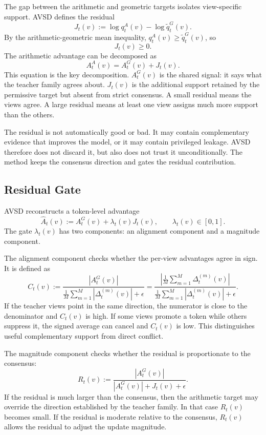 The gap between the arithmetic and geometric targets isolates view-specific support. AVSD defines the residual
\[
    J_t(v) := \log q_t^A(v)-\log \widetilde{q}_t^G(v).
\]
By the arithmetic-geometric mean inequality, $q_t^A(v)\geq \widetilde{q}_t^G(v)$, so
\[
    J_t(v)\geq 0.
\]
The arithmetic advantage can be decomposed as
\[
    A_t^A(v)=A_t^G(v)+J_t(v).
\]
This equation is the key decomposition. $A_t^G(v)$ is the shared signal: it says what the teacher family agrees about. $J_t(v)$ is the additional support retained by the permissive target but absent from strict consensus. A small residual means the views agree. A large residual means at least one view assigns much more support than the others.

The residual is not automatically good or bad. It may contain complementary evidence that improves the model, or it may contain privileged leakage. AVSD therefore does not discard it, but also does not trust it unconditionally. The method keeps the consensus direction and gates the residual contribution.

\subsection{Residual Gate}

AVSD reconstructs a token-level advantage
\[
    \widehat{A}_t(v)
    := A_t^G(v)+\lambda_t(v)J_t(v),
    \qquad \lambda_t(v)\in[0,1].
\]
The gate $\lambda_t(v)$ has two components: an alignment component and a magnitude component.

The alignment component checks whether the per-view advantages agree in sign. It is defined as
\[
    C_t(v)
    :=
    \frac{|A_t^G(v)|}
    {\frac{1}{M}\sum_{m=1}^{M}|\Delta_t^{(m)}(v)|+\epsilon}
    =
    \frac{
    \left|\frac{1}{M}\sum_{m=1}^{M}\Delta_t^{(m)}(v)\right|}
    {\frac{1}{M}\sum_{m=1}^{M}|\Delta_t^{(m)}(v)|+\epsilon}.
\]
If the teacher views point in the same direction, the numerator is close to the denominator and $C_t(v)$ is high. If some views promote a token while others suppress it, the signed average can cancel and $C_t(v)$ is low. This distinguishes useful complementary support from direct conflict.

The magnitude component checks whether the residual is proportionate to the consensus:
\[
    R_t(v)
    :=
    \frac{|A_t^G(v)|}{|A_t^G(v)|+J_t(v)+\epsilon}.
\]
If the residual is much larger than the consensus, then the arithmetic target may override the direction established by the teacher family. In that case $R_t(v)$ becomes small. If the residual is moderate relative to the consensus, $R_t(v)$ allows the residual to adjust the update magnitude.

